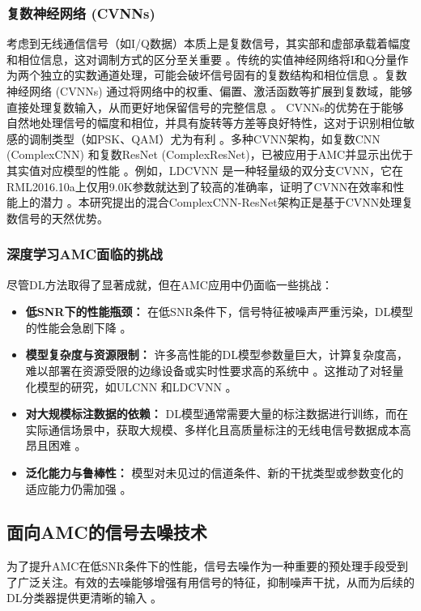 \documentclass[conference]{IEEEtran}
\begin{document}
\subsubsection{复数神经网络 (CVNNs)}
考虑到无线通信信号（如I/Q数据）本质上是复数信号，其实部和虚部承载着幅度和相位信息，这对调制方式的区分至关重要 \cite{[11]}。传统的实值神经网络将I和Q分量作为两个独立的实数通道处理，可能会破坏信号固有的复数结构和相位信息 \cite{[11]}\cite{[42]}。复数神经网络 (CVNNs) 通过将网络中的权重、偏置、激活函数等扩展到复数域，能够直接处理复数输入，从而更好地保留信号的完整信息 \cite{[11]}\cite{[43]}\cite{[44]}。
CVNNs的优势在于能够自然地处理信号的幅度和相位，并具有旋转等方差等良好特性，这对于识别相位敏感的调制类型（如PSK、QAM）尤为有利 \cite{[11]}。多种CVNN架构，如复数CNN (ComplexCNN) 和复数ResNet (ComplexResNet)，已被应用于AMC并显示出优于其实值对应模型的性能 \cite{[11]}\cite{[45]}。例如，LDCVNN \cite{b4} 是一种轻量级的双分支CVNN，它在RML2016.10a上仅用9.0K参数就达到了较高的准确率，证明了CVNN在效率和性能上的潜力 \cite{[46]}\cite{[47]}。本研究提出的混合ComplexCNN-ResNet架构正是基于CVNN处理复数信号的天然优势。

\subsubsection{深度学习AMC面临的挑战}
尽管DL方法取得了显著成就，但在AMC应用中仍面临一些挑战：
\begin{itemize}
    \item \textbf{低SNR下的性能瓶颈：} 在低SNR条件下，信号特征被噪声严重污染，DL模型的性能会急剧下降 \cite{[1]}\cite{[5]}\cite{[28]}\cite{[29]}\cite{[30]}。
    \item \textbf{模型复杂度与资源限制：} 许多高性能的DL模型参数量巨大，计算复杂度高，难以部署在资源受限的边缘设备或实时性要求高的系统中 \cite{[5]}\cite{[23]}\cite{[26]}\cite{[28]}\cite{[31]}\cite{[47]}。这推动了对轻量化模型的研究，如ULCNN \cite{b1} \cite{[23]}\cite{[48]} 和LDCVNN \cite{b4} \cite{[46]}\cite{[47]}。
    \item \textbf{对大规模标注数据的依赖：} DL模型通常需要大量的标注数据进行训练，而在实际通信场景中，获取大规模、多样化且高质量标注的无线电信号数据成本高昂且困难 \cite{[5]}\cite{[8]}\cite{[12]}\cite{[19]}\cite{[49]}\cite{[50]}\cite{[51]}。
    \item \textbf{泛化能力与鲁棒性：} 模型对未见过的信道条件、新的干扰类型或参数变化的适应能力仍需加强 \cite{[5]}。
\end{itemize}

\subsection{面向AMC的信号去噪技术}
为了提升AMC在低SNR条件下的性能，信号去噪作为一种重要的预处理手段受到了广泛关注。有效的去噪能够增强有用信号的特征，抑制噪声干扰，从而为后续的DL分类器提供更清晰的输入 \cite{[1]}\cite{[15]}\cite{[16]}\cite{[20]}\cite{[30]}\cite{[52]}。
\end{document}
